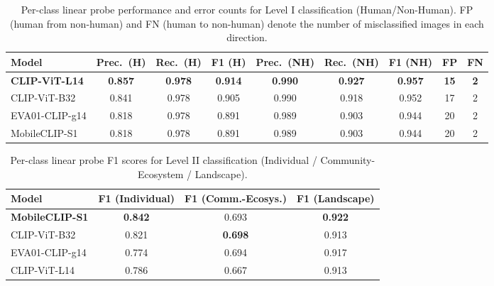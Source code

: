 \documentclass[hidelinks, 11pt]{article}
\begin{document}
\begin{table}[htbp]
\centering
\caption{Per-class linear probe performance and error counts for Level I classification (Human/Non-Human). FP (human from non-human) and FN (human to non-human) denote the number of misclassified images in each direction.}
\label{tab:linearprobe_perclass_humannonhuman}
\begin{tabular}{@{}lcccccccc@{}}
\toprule
\textbf{Model} & \textbf{Prec.\ (H)} & \textbf{Rec.\ (H)} & \textbf{F1 (H)} & \textbf{Prec.\ (NH)} & \textbf{Rec.\ (NH)} & \textbf{F1 (NH)} & \textbf{FP} & \textbf{FN} \\
\midrule
\textbf{CLIP-ViT-L14}  & \textbf{0.857} & \textbf{0.978} & \textbf{0.914} & \textbf{0.990} & \textbf{0.927} & \textbf{0.957} & \textbf{15} & \textbf{2} \\
CLIP-ViT-B32           & 0.841 & 0.978 & 0.905 & 0.990 & 0.918 & 0.952 & 17 & 2 \\
EVA01-CLIP-g14         & 0.818 & 0.978 & 0.891 & 0.989 & 0.903 & 0.944 & 20 & 2 \\
MobileCLIP-S1          & 0.818 & 0.978 & 0.891 & 0.989 & 0.903 & 0.944 & 20 & 2 \\
\bottomrule
\end{tabular}
\end{table}

\begin{table}[htbp]
\centering
\caption{Per-class linear probe F1 scores for Level II classification (Individual / Community-Ecosystem / Landscape).}
\label{tab:linearprobe_perclass_indcoecoland}
\begin{tabular}{@{}lccc@{}}
\toprule
\textbf{Model} & \textbf{F1 (Individual)} & \textbf{F1 (Comm.-Ecosys.)} & \textbf{F1 (Landscape)} \\
\midrule
\textbf{MobileCLIP-S1}  & \textbf{0.842} & 0.693          & \textbf{0.922} \\
CLIP-ViT-B32            & 0.821          & \textbf{0.698} & 0.913          \\
EVA01-CLIP-g14          & 0.774          & 0.694          & 0.917          \\
CLIP-ViT-L14            & 0.786          & 0.667          & 0.913          \\
\bottomrule
\end{tabular}
\end{table}
\end{document}
